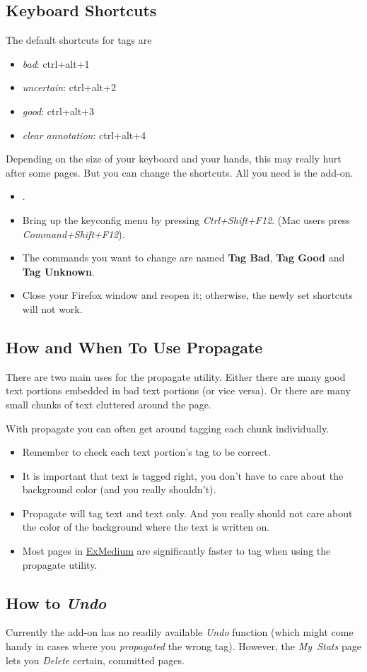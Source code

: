 \documentclass[12pt,a4paper]{article}
\begin{document}
\subsection{Keyboard Shortcuts}
The default shortcuts for tags are \\
\begin{itemize}
	\item \emph{bad}: ctrl+alt+1
	\item \emph{uncertain}: ctrl+alt+2
	\item \emph{good}: ctrl+alt+3
	\item \emph{clear annotation}: ctrl+alt+4
\end{itemize}

Depending on the size of your keyboard and your hands, this may really hurt after some pages. But you can change the shortcuts. All you need is the  add-on.

\begin{itemize}
	\item {}.
	\item Bring up the keyconfig menu by pressing \emph{Ctrl+Shift+F12}. (Mac users press \emph{Command+Shift+F12}).
	\item The commands you want to change are named \textbf{Tag Bad}, \textbf{Tag Good} and \textbf{Tag Unknown}.
	\item Close your Firefox window and reopen it; otherwise, the newly set shortcuts will not work.
\end{itemize}


\subsection{How and When To Use Propagate}
\label{TnTProp}
There are two main uses for the propagate utility. Either there are many good text portions embedded in bad text portions (or vice versa). Or there are many small chunks of text cluttered around the page.

With propagate you can often get around tagging each chunk individually.

\begin{itemize}
\item Remember to check each text portion's tag to be correct. \\
\item It is important that text is tagged right, you don't have to care about the background color (and you really shouldn't). \\
\item Propagate will tag text and text only. And you really should not care about the color of the background where the text is written on. \\
\item Most pages in \hyperref{Examples - Medium}{Examples - Medium, ~}{}{ExMedium} are significantly faster to tag when using the propagate utility. \\
\end{itemize}


\subsection{How to \emph{Undo}}
Currently the add-on has no readily available \emph{Undo} function (which might come handy in cases where you \emph{propagated} the wrong tag). However, the \emph{My~Stats} page lets you \emph{Delete} certain, committed pages. 
\end{document}
